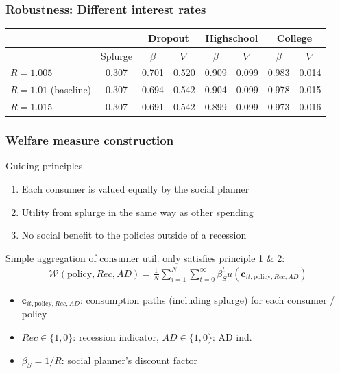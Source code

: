 \documentclass[pdflatex,aspectratio=169]{beamer}
\begin{document}
\begin{frame}
	\frametitle{Robustness: Different interest rates}
	\begin{tabular}{lc|cccccc} 
		\toprule
		& & \multicolumn{2}{c}{Dropout} & \multicolumn{2}{c}{Highschool} & \multicolumn{2}{c}{College} \\ \midrule 
		& Splurge & $\beta$ & $\nabla$ & $\beta$ & $\nabla$ & $\beta$ & $\nabla$ \\ \midrule 
		$R = 1.005$ & 0.307 & 0.701 & 0.520 & 0.909 & 0.099 & 0.983 & 0.014 \\
		$R = 1.01$ (baseline) & 0.307 & 0.694 & 0.542 & 0.904 & 0.099 & 0.978 & 0.015 \\ 
		$R = 1.015$ & 0.307 & 0.691 & 0.542 & 0.899 & 0.099 & 0.973 & 0.016 
		\\ \bottomrule 
	\end{tabular}
\end{frame}



\begin{frame}
	\frametitle{Welfare measure construction}
	\hypertarget{WelfareMeasure1}{}
	
	Guiding principles
	
	\begin{enumerate}
		\item Each consumer is valued equally by the social planner 
		\item Utility from splurge in the same way as other spending
		\item No social benefit to the policies outside of a recession
	\end{enumerate} 
	
	\vspace{0.6cm}
	
	Simple aggregation of consumer util. only satisfies principle 1 \& 2:
	\begin{align*}
		\mathcal{W}(\text{policy},Rec,AD) =\frac{1}{N}\sum_{i=1}^{N} \sum_{t=0}^{\infty} \beta_S^t u(\mathbf{c}_{it,\text{policy},Rec,AD}) 
	\end{align*}
	
	\begin{itemize}
		\item $\mathbf{c}_{it,\text{policy},Rec,AD}$: consumption paths (including splurge) for each consumer / policy
		\item $Rec\in\{1,0\}$: recession indicator, $AD\in\{1,0\}$: AD ind.
		\item $\beta_S = 1/R$: social planner's discount factor 
	\end{itemize}	

	\vspace{1cm}
	\hyperlink{WelfareMeasure}{}
	
\end{frame}
\end{document}
